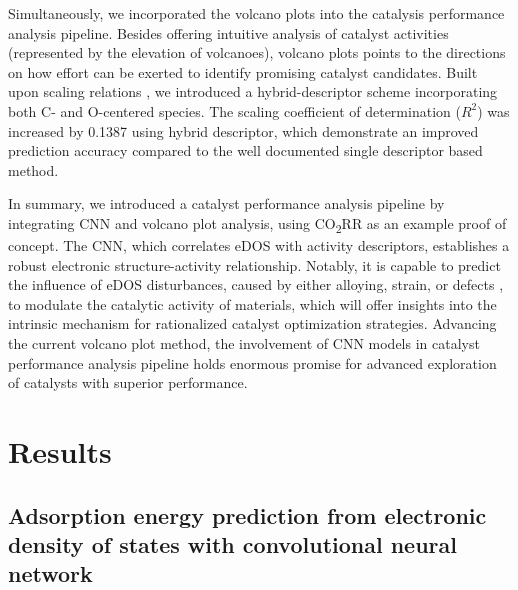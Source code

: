     Simultaneously, we incorporated the volcano plots into the catalysis performance analysis pipeline.
    Besides offering intuitive analysis of catalyst activities (represented by the elevation of volcanoes), volcano plots points to the directions on how effort can be exerted to identify promising catalyst candidates.
    Built upon scaling relations \cite{peterson2012activity}, we introduced a hybrid-descriptor scheme incorporating both C- and O-centered species.
    The scaling coefficient of determination ($R^2$) was increased by 0.1387 using hybrid descriptor, which demonstrate an improved prediction accuracy compared to the well documented single descriptor based method.

    In summary, we introduced a catalyst performance analysis pipeline by integrating CNN and volcano plot analysis, using CO\textsubscript{2}RR as an example proof of concept.
    The CNN, which correlates eDOS with activity descriptors, establishes a robust electronic structure-activity relationship.
    Notably, it is capable to predict the influence of eDOS disturbances, caused by either alloying, strain, or defects \cite{norskov2011density, bera2017density, kusada2019emergence}, to modulate the catalytic activity of materials, which will offer insights into the intrinsic mechanism for rationalized catalyst optimization strategies.
    Advancing the current volcano plot method, the involvement of CNN models in catalyst performance analysis pipeline holds enormous promise for advanced exploration of catalysts with superior performance.


\newpage
\section{Results}

\subsection{Adsorption energy prediction from electronic density of states with convolutional neural network}

